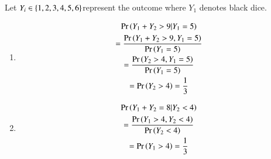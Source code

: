 Let $Y_i \in \left\{1,2,3,4,5,6\right\}$represent the outcome where $Y_1$ denotes black dice.

\begin{enumerate}
\item 
\begin{multline}
\Pr\left(Y_1+Y_2 >9| Y_1 = 5\right) 
\\
= \frac{\Pr\left(Y_1+Y_2 >9, Y_1 = 5\right)}{\Pr\left(Y_1 = 5\right)}
\\
= \frac{\Pr\left(Y_2 > 4, Y_1 = 5\right)}{\Pr\left(Y_1 = 5\right)} 
\\
= \Pr\left(Y_2 > 4\right) = \frac{1}{3}
\end{multline}
\item 
\begin{multline}
\Pr\left(Y_1+Y_2 = 8| Y_2 < 4\right) 
\\
= \frac{\Pr\left(Y_1 >4, Y_2 < 4\right)}{\Pr\left( Y_2 < 4\right)}
\\
=  \Pr\left(Y_1 > 4\right) = \frac{1}{3}
\end{multline}
\end{enumerate}
